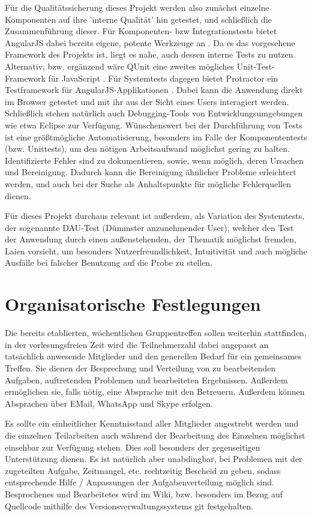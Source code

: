 Für die Qualitätssicherung dieses Projekt werden also zunächst einzelne Komponenten auf ihre 'interne Qualität' hin getestet, und schließlich die Zusammenführung dieser. Für Komponenten- bzw Integrationstests bietet AngularJS dabei bereits eigene, potente Werkzeuge an \cite{[1]}. Da es das vorgesehene Framework des Projekts ist, liegt es nahe, auch dessen interne Tests zu nutzen. Alternativ, bzw. ergänzend wäre QUnit eine zweites mögliches Unit-Test-Framework für JavaScript \cite{[2]}. Für Systemtests dagegen bietet Protractor ein Testframework für AngularJS-Applikationen \cite{[3]}. Dabei kann die Anwendung direkt im Browser getestet und mit ihr aus der Sicht eines Users interagiert werden. Schließlich stehen natürlich auch Debugging-Tools von Entwicklungsumgebungen wie etwa Eclipse zur Verfügung. 
Wünschenswert bei der Durchführung von Tests ist eine größtmögliche Automatisierung, besonders im Falle der Komponententests (bzw. Unittests), um den nötigen Arbeitsaufwand möglichst gering zu halten. Identifizierte Fehler sind zu dokumentieren, sowie, wenn möglich, deren Ursachen und Bereinigung. Dadurch kann die Bereinigung ähnlicher Probleme erleichtert werden, und auch bei der Suche als Anhaltspunkte für mögliche Fehlerquellen dienen.

Für dieses Projekt durchaus relevant ist außerdem, als Variation des Systemtests, der sogenannte DAU-Test (Dümmster anzunehmender User), welcher den Test der Anwendung durch einen außenstehenden, der Thematik möglichst fremden, Laien vorsieht, um besonders Nutzerfreundlichkeit, Intuitivität und auch mögliche Ausfälle bei falscher Benutzung auf die Probe zu stellen.

\section{Organisatorische Festlegungen}

Die bereits etablierten, wöchentlichen Gruppentreffen sollen weiterhin stattfinden, in der vorlesungsfreien Zeit wird die Teilnehmerzahl dabei angepasst an tatsächlich anwesende Mitglieder und den generellen Bedarf für ein gemeinsames Treffen. Sie dienen der Besprechung und Verteilung von zu bearbeitenden Aufgaben, auftretenden Problemen und bearbeiteten Ergebnissen. Außerdem ermöglichen sie, falls nötig, eine Absprache mit den Betreuern. Außerdem können Absprachen über EMail, WhatsApp und Skype erfolgen.

Es sollte ein einheitlicher Kenntnisstand aller Mitglieder angestrebt werden und die einzelnen Teilarbeiten auch während der Bearbeitung des Einzelnen möglichst einsehbar zur Verfügung stehen. Dies soll besonders der gegenseitigen Unterstützung dienen. Es ist natürlich aber unabdingbar, bei Problemen mit der zugeteilten Aufgabe, Zeitmangel, etc. rechtzeitig Bescheid zu geben, sodass entsprechende Hilfe / Anpassungen der Aufgabenverteilung möglich sind.
Besprochenes und Bearbeitetes wird im Wiki, bzw. besonders im Bezug auf Quellcode mithilfe des Versionsverwaltungssystems git festgehalten.

